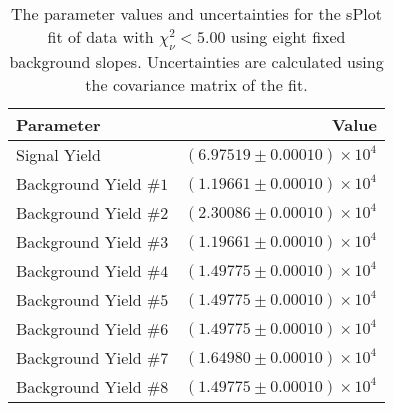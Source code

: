 
\begin{table}[ht]
    \begin{center}
        \begin{tabular}{lr}\toprule
            Parameter & Value \\\midrule
            Signal Yield & $(6.97519 \pm 0.00010) \times 10^{4}$ \\
            Background Yield $\#1$ & $(1.19661 \pm 0.00010) \times 10^{4}$ \\
            Background Yield $\#2$ & $(2.30086 \pm 0.00010) \times 10^{4}$ \\
            Background Yield $\#3$ & $(1.19661 \pm 0.00010) \times 10^{4}$ \\
            Background Yield $\#4$ & $(1.49775 \pm 0.00010) \times 10^{4}$ \\
            Background Yield $\#5$ & $(1.49775 \pm 0.00010) \times 10^{4}$ \\
            Background Yield $\#6$ & $(1.49775 \pm 0.00010) \times 10^{4}$ \\
            Background Yield $\#7$ & $(1.64980 \pm 0.00010) \times 10^{4}$ \\
            Background Yield $\#8$ & $(1.49775 \pm 0.00010) \times 10^{4}$ \\\bottomrule
        \end{tabular}
        \caption{The parameter values and uncertainties for the sPlot fit of data with $\chi^2_\nu < 5.00$ using eight fixed background slopes. Uncertainties are calculated using the covariance matrix of the fit.}\label{tab:splot-fit-results-chisqdof-5.00-fixed-8}
    \end{center}
\end{table}
